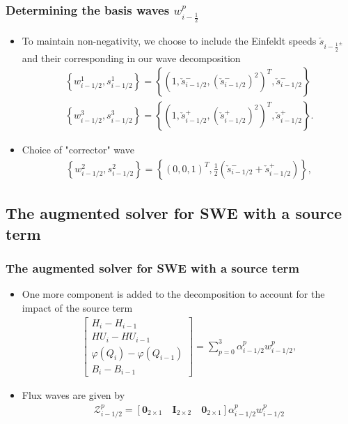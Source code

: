 \documentclass{beamer}
\begin{document}
\frame
{
\frametitle{Determining the basis waves $w_{i-\frac{1}{2}}^p$}
\begin{itemize}
\item<1-> To maintain non-negativity, we choose to include the Einfeldt speeds $\check s_{i-\frac{1}{2}^\pm}$ and their corresponding  in our wave decomposition
\begin{align*}
\left\{ w_{i-1/2}^1,s_{i-1/2}^1\right\}=\left\{\left(1,\check{s}_{i-1/2}^-,\left(\check{s}_{i-1/2}^-\right)^2\right)^T, \check{s}_{i-1/2}^- \right\} \\
\left\{ w_{i-1/2}^3,s_{i-1/2}^3\right\}=\left\{\left(1,\check{s}_{i-1/2}^+,\left(\check{s}_{i-1/2}^+\right)^2\right)^T, \check{s}_{i-1/2}^+ \right\}.
\end{align*}
\item<2-> Choice of "corrector" wave
\begin{align*}
\left\{ w_{i-1/2}^2,s_{i-1/2}^2      \right\}=\left\{  \left(0,0,1\right)^T, \frac{1}{2} \left(\check{s}_{i-1/2}^- + \check{s}_{i-1/2}^+ \right)    \right\},
\end{align*}
\end{itemize}
}

\subsection{The augmented solver for SWE with a source term}
\frame
{
\frametitle{The augmented solver for SWE with a source term}
\begin{itemize}
\item<1-> One more component is added to the decomposition to account for the impact of the source term
\begin{align*}
\begin{bmatrix}
H_i-H_{i-1}\\
HU_i-HU_{i-1}\\
\varphi(Q_i)-\varphi(Q_{i-1}) \\
B_i-B_{i-1}
\end{bmatrix}=\sum_{p=0}^3 \alpha_{i-1/2}^p w_{i-1/2}^p,
\end{align*}
\item<2->  Flux waves are given by
\begin{align*}
\mathcal{Z}_{i-1/2}^p =\left[\mathbf{0}_{2\times1} \quad \mathbf{I}_{2\times2} \quad \mathbf{0}_{2\times1}\right] \alpha_{i-1/2}^p w_{i-1/2}^p
\end{align*}
\end{itemize}
}
\end{document}

